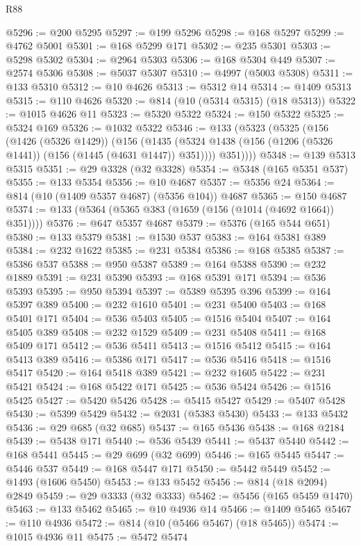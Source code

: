 \begin{lexlean}{R88}
\begin{coremodule}
@5296 := @200 @5295
@5297 := @199 @5296
@5298 := @168 @5297
@5299 := @4762 @5001
@5301 := @168 @5299 @171
@5302 := @235 @5301
@5303 := @5298 @5302
@5304 := @2964 @5303
@5306 := @168 @5304 @449
@5307 := @2574 @5306
@5308 := @5037 @5307
@5310 := @4997 (@5003 @5308)
@5311 := @133 @5310
@5312 := @10 @4626
@5313 := @5312 @14
@5314 := @1409 @5313
@5315 := @110 @4626
@5320 := @814 (@10 (@5314 @5315) (@18 @5313))
@5322 := @1015 @4626 @11
@5323 := @5320 @5322
@5324 := @150 @5322
@5325 := @5324 @169
@5326 := @1032 @5322
@5346 := @133
    (@5323
      (@5325
        (@156
          (@1426 (@5326 @1429))
          (@156
            (@1435 (@5324 @1438 (@156 (@1206 (@5326 @1441)) (@156 (@1445 (@4631 @1447)) @351))))
            @351))))
@5348 := @139 @5313 @5315
@5351 := @29 @3328 (@32 @3328)
@5354 := @5348 (@165 @5351 @537)
@5355 := @133 @5354
@5356 := @10 @4687
@5357 := @5356 @24
@5364 := @814 (@10 (@1409 @5357 @4687) (@5356 @104)) @4687
@5365 := @150 @4687
@5374 := @133 (@5364 (@5365 @383 (@1659 (@156 (@1014 (@4692 @1664)) @351))))
@5376 := @647 @5357 @4687
@5379 := @5376 (@165 @544 @651)
@5380 := @133 @5379
@5381 := @1530 @537
@5383 := @164 @5381 @389
@5384 := @232 @1622
@5385 := @231 @5384
@5386 := @168 @5385
@5387 := @5386 @537
@5388 := @950 @5387
@5389 := @164 @5388
@5390 := @232 @1889
@5391 := @231 @5390
@5393 := @168 @5391 @171
@5394 := @536 @5393
@5395 := @950 @5394
@5397 := @5389 @5395 @396
@5399 := @164 @5397 @389
@5400 := @232 @1610
@5401 := @231 @5400
@5403 := @168 @5401 @171
@5404 := @536 @5403
@5405 := @1516 @5404
@5407 := @164 @5405 @389
@5408 := @232 @1529
@5409 := @231 @5408
@5411 := @168 @5409 @171
@5412 := @536 @5411
@5413 := @1516 @5412
@5415 := @164 @5413 @389
@5416 := @5386 @171
@5417 := @536 @5416
@5418 := @1516 @5417
@5420 := @164 @5418 @389
@5421 := @232 @1605
@5422 := @231 @5421
@5424 := @168 @5422 @171
@5425 := @536 @5424
@5426 := @1516 @5425
@5427 := @5420 @5426
@5428 := @5415 @5427
@5429 := @5407 @5428
@5430 := @5399 @5429
@5432 := @2031 (@5383 @5430)
@5433 := @133 @5432
@5436 := @29 @685 (@32 @685)
@5437 := @165 @5436
@5438 := @168 @2184
@5439 := @5438 @171
@5440 := @536 @5439
@5441 := @5437 @5440
@5442 := @168 @5441
@5445 := @29 @699 (@32 @699)
@5446 := @165 @5445
@5447 := @5446 @537
@5449 := @168 @5447 @171
@5450 := @5442 @5449
@5452 := @1493 (@1606 @5450)
@5453 := @133 @5452
@5456 := @814 (@18 @2094) @2849
@5459 := @29 @3333 (@32 @3333)
@5462 := @5456 (@165 @5459 @1470)
@5463 := @133 @5462
@5465 := @10 @4936 @14
@5466 := @1409 @5465
@5467 := @110 @4936
@5472 := @814 (@10 (@5466 @5467) (@18 @5465))
@5474 := @1015 @4936 @11
@5475 := @5472 @5474

\end{coremodule}
\end{lexlean}
